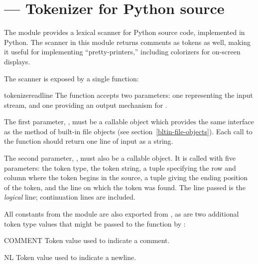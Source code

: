\section{ ---
         Tokenizer for Python source}



The  module provides a lexical scanner for Python
source code, implemented in Python.  The scanner in this module
returns comments as tokens as well, making it useful for implementing
``pretty-printers,'' including colorizers for on-screen displays.

The scanner is exposed by a single function:


\begin{funcdesc}{tokenize}{readline}
  The  function accepts two parameters: one
  representing the input stream, and one providing an output mechanism 
  for .

  The first parameter, , must be a callable object which
  provides the same interface as the  method of
  built-in file objects (see section~\ref{bltin-file-objects}).  Each
  call to the function should return one line of input as a string.

  The second parameter, , must also be a callable
  object.  It is called with five parameters: the token type, the
  token string, a tuple  specifying the 
  row and column where the token begins in the source, a tuple
   giving the ending position of the
  token, and the line on which the token was found.  The line passed
  is the \emph{logical} line; continuation lines are included.
\end{funcdesc}


All constants from the  module are also exported from 
, as are two additional token type values that might be 
passed to the  function by :

\begin{datadesc}{COMMENT}
  Token value used to indicate a comment.
\end{datadesc}
\begin{datadesc}{NL}
  Token value used to indicate a newline.
\end{datadesc}
